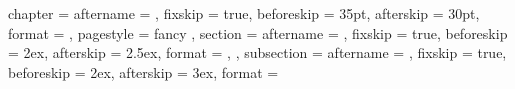 \ctexset
  {
    chapter    =
      {
        aftername  = \hspace{.5\ccwd}, fixskip   = true,
        beforeskip = 35pt,             afterskip = 30pt,
        format     = \sffamily\centering\semiLarge,
        pagestyle  = fancy
      },
    section    =
      {
        aftername  = \hspace{.5\ccwd}, fixskip   = true,
        beforeskip = 2ex,              afterskip = 2.5ex,
        format = \sffamily\large
         ,
      },
    subsection =
      {
        aftername  = \hspace{.5\ccwd}, fixskip   = true,
        beforeskip = 2ex,           afterskip = 3ex,
        format     = \sffamily\semilarge
      }
  }

\makeatother \ExplSyntaxOff
\endinput
